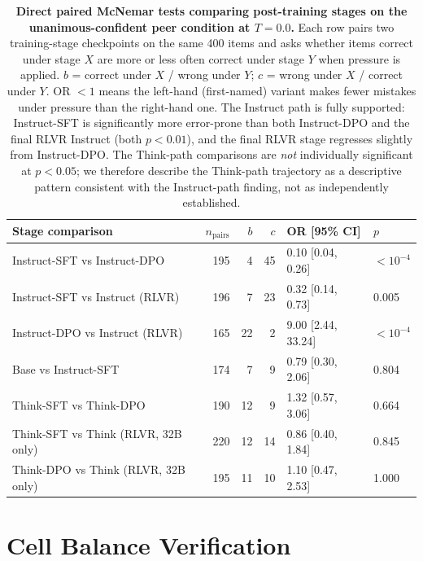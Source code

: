\documentclass{article}
\begin{document}
\begin{table}[H]
    \centering
    \footnotesize
    \setlength{\tabcolsep}{4pt}
    \renewcommand{\arraystretch}{1.0}
    \begin{tabular}{l r r r l l}
        \toprule
        Stage comparison & $n_{\text{pairs}}$ & $b$ & $c$ & OR [95\% CI] & $p$ \\
        \midrule
        Instruct-SFT vs Instruct-DPO & 195 & 4 & 45 & 0.10 [0.04, 0.26] & $<10^{-4}$ \\
        Instruct-SFT vs Instruct (RLVR) & 196 & 7 & 23 & 0.32 [0.14, 0.73] & 0.005 \\
        Instruct-DPO vs Instruct (RLVR) & 165 & 22 & 2 & 9.00 [2.44, 33.24] & $<10^{-4}$ \\
        Base vs Instruct-SFT & 174 & 7 & 9 & 0.79 [0.30, 2.06] & 0.804 \\
        Think-SFT vs Think-DPO & 190 & 12 & 9 & 1.32 [0.57, 3.06] & 0.664 \\
        Think-SFT vs Think (RLVR, 32B only) & 220 & 12 & 14 & 0.86 [0.40, 1.84] & 0.845 \\
        Think-DPO vs Think (RLVR, 32B only) & 195 & 11 & 10 & 1.10 [0.47, 2.53] & 1.000 \\
        \bottomrule
    \end{tabular}
    \caption{\textbf{Direct paired McNemar tests comparing post-training stages on the unanimous-confident peer condition at $T{=}0.0$.} Each row pairs two training-stage checkpoints on the same 400 items and asks whether items correct under stage $X$ are more or less often correct under stage $Y$ when pressure is applied. $b$ = correct under $X$ / wrong under $Y$; $c$ = wrong under $X$ / correct under $Y$. OR $<1$ means the left-hand (first-named) variant makes fewer mistakes under pressure than the right-hand one. The Instruct path is fully supported: Instruct-SFT is significantly more error-prone than both Instruct-DPO and the final RLVR Instruct (both $p < 0.01$), and the final RLVR stage regresses slightly from Instruct-DPO. The Think-path comparisons are \emph{not} individually significant at $p<0.05$; we therefore describe the Think-path trajectory as a descriptive pattern consistent with the Instruct-path finding, not as independently established.}
    \label{tab:between_stage}
\end{table}


\section{Cell Balance Verification}
\label{app:balance}
\end{document}
